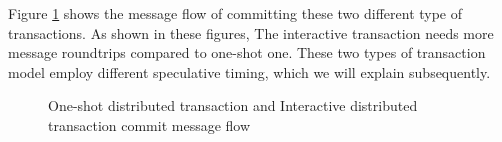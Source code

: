 \documentclass[conference]{IEEEtran}
\begin{document}
Figure \ref{fig:transaction_type} shows the message flow of committing these two different type of transactions.
As shown in these figures, The interactive transaction needs more message roundtrips compared to one-shot one.
These two types of transaction model employ different speculative timing, which we will explain subsequently.

\begin{figure}[htbp]
    \centering
 
  \caption{One-shot distributed transaction and Interactive distributed transaction commit message flow}
  \label{fig:transaction_type} 
\end{figure}
\end{document}
